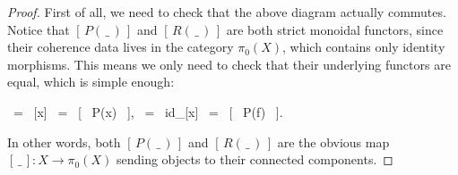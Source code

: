 \documentclass{amsart} %
\newenvironment{eq*}{\begin{equation*}}{\end{equation*}}
\begin{document}
\begin{proof}
First of all, we need to check that the above diagram actually commutes. Notice that $[ \, P( \, \_ \, ) \, ]$ and $[ \, R( \, \_ \, ) \, ]$ are both strict monoidal functors, since their coherence data lives in the category $\pi_0(X)$, which contains only identity morphisms. This means we only need to check that their underlying functors are equal, which is simple enough:
\begin{eq*} [ \, R(x) \, ] \, = \, [x] \, = \, [ \, P(x) \, ], \quad \quad \quad [ \, R(f: x \to y) \, ] \, = \, id_{[x]} \, = \, [ \, P(f) \, ]. \end{eq*}
In other words, both  $[ \, P( \, \_ \, ) \, ]$ and $[ \, R( \, \_ \, ) \, ]$ are the obvious map $[ \, \_ \, ]: X \to \pi_0(X)$ sending objects to their connected components. 


\end{proof}
\end{document}
